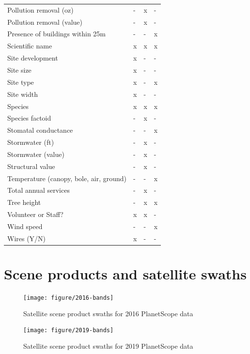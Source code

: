 \documentclass[12pt,twoside]{reedthesis}
\begin{document}
\begin{longtable}[t]{llll}
Pollution removal (oz) & - & x & -\\
Pollution removal (value) & - & x & -\\
Presence of buildings within 25m & - & - & x\\
\addlinespace
Scientific name & x & x & x\\
Site development & x & - & -\\
Site size & x & - & -\\
Site type & x & - & x\\
Site width & x & - & -\\
\addlinespace
Species & x & x & x\\
Species factoid & - & x & -\\
Stomatal conductance & - & - & x\\
Stormwater (ft) & - & x & -\\
Stormwater (value) & - & x & -\\
\addlinespace
Structural value & - & x & -\\
Temperature (canopy, bole, air, ground) & - & - & x\\
Total annual services & - & x & -\\
Tree height & - & x & x\\
Volunteer or Staff? & x & x & -\\
\addlinespace
Wind speed & - & - & x\\
Wires (Y/N) & x & - & -\\
\bottomrule
\end{longtable}
\hypertarget{scene-products-and-satellite-swaths}{%
\section*{Scene products and satellite swaths}\label{scene-products-and-satellite-swaths}}
\begin{figure}

{\centering \texttt{[image: figure/2016-bands]} 

}

\caption{Satellite scene product swaths for 2016 PlanetScope data}\label{fig:2016-swath}
\end{figure}
\begin{figure}

{\centering \texttt{[image: figure/2019-bands]} 

}

\caption{Satellite scene product swaths for 2019 PlanetScope data}\label{fig:2019-swath}
\end{figure}
\end{document}
